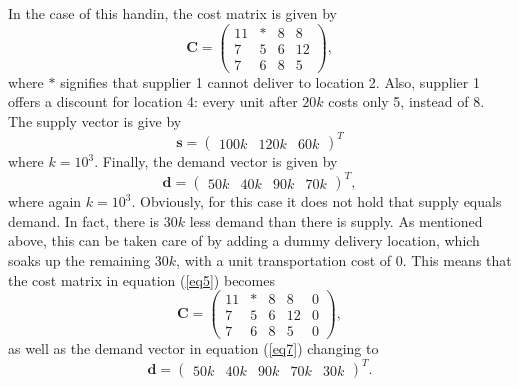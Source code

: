 \documentclass{article}
\begin{document}
  \noindent
  In the case of this handin, the cost matrix is given by
  \begin{equation}
    \mathbf{C} = 
    \begin{pmatrix}
      11 & * & 8 & 8 \\
      7  & 5 & 6 & 12 \\
      7  & 6 & 8 & 5
    \end{pmatrix},
    \label{eq5}
  \end{equation}
  where $*$ signifies that supplier 1 cannot deliver to location 2. Also, supplier 1 offers a discount for location 4: every unit after $20k$ costs only 5, instead of 8.
  The supply vector is give by
  \begin{equation}
    \mathbf{s} =
    \begin{pmatrix}
      100k & 120k & 60k
    \end{pmatrix}^T
    \label{eq6}
  \end{equation}
  where $k = 10^3$. Finally, the demand vector is given by
  \begin{equation}
    \mathbf{d} =
    \begin{pmatrix}
      50k & 40k & 90k & 70k
    \end{pmatrix}^T,
    \label{eq7}
  \end{equation}
  where again $k = 10^3$. Obviously, for this case it does not hold that supply equals demand. In fact, there is $30k$ less demand than there is supply. As mentioned above, this can be taken care of by adding a dummy delivery location, which soaks up the remaining $30k$, with
  a unit transportation cost of $0$. This means that the cost matrix in equation (\ref{eq5}) becomes
  \begin{equation}
    \mathbf{C} = 
    \begin{pmatrix}
      11 & * & 8 & 8  & 0\\
      7  & 5 & 6 & 12 & 0\\
      7  & 6 & 8 & 5  & 0
    \end{pmatrix},
    \label{eq8}
  \end{equation}
  as well as the demand vector in equation (\ref{eq7}) changing to
  \begin{equation}
    \mathbf{d} =
    \begin{pmatrix}
      50k & 40k & 90k & 70k & 30k
    \end{pmatrix}^T.
    \label{eq9}
  \end{equation}
\end{document}
